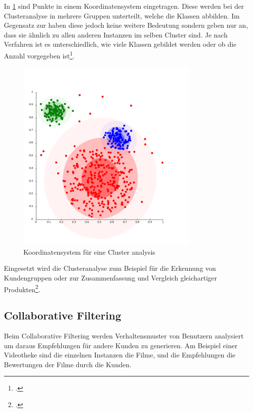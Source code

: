 In \cref{fig:recherche:dataminingtechniken:disziplinen:clusteranalysis} sind Punkte in einem Koordinatensystem eingetragen. Diese werden bei der Clusteranalyse in mehrere Gruppen unterteilt, welche die Klassen abbilden. Im Gegensatz zur  haben diese jedoch keine weitere Bedeutung sondern geben nur an, dass sie ähnlich zu allen anderen Instanzen im selben Cluster sind. Je nach Verfahren ist es unterschiedlich, wie viele Klassen gebildet werden oder ob die Anzahl vorgegeben ist\footcite{data_mining_concepts_and_techniques}.
\begin{figure}[H]
	\RawFloats
	\centering
	\includegraphics[width=0.8\textwidth]{images/clusteranalysis.png}
	\caption{Koordinatensystem für eine Cluster analysis}
	\label{fig:recherche:dataminingtechniken:disziplinen:clusteranalysis}
\end{figure}

Eingesetzt wird die Clusteranalyse zum Beispiel für die Erkennung von Kundengruppen oder zur  Zusammenfassung und Vergleich gleichartiger Produkten\footcite{einsatzgebiet_clusteranalyse}.


\subsection{Collaborative Filtering}
\label{sec:recherche:dataminingtechniken:disziplinen:collaborativefiltering}
Beim Collaborative Filtering werden Verhaltensmuster von Benutzern analysiert um daraus Empfehlungen für andere Kunden zu generieren. Am Beispiel einer Videotheke sind die einzelnen Instanzen die Filme, und die Empfehlungen die Bewertungen der Filme durch die Kunden. 

